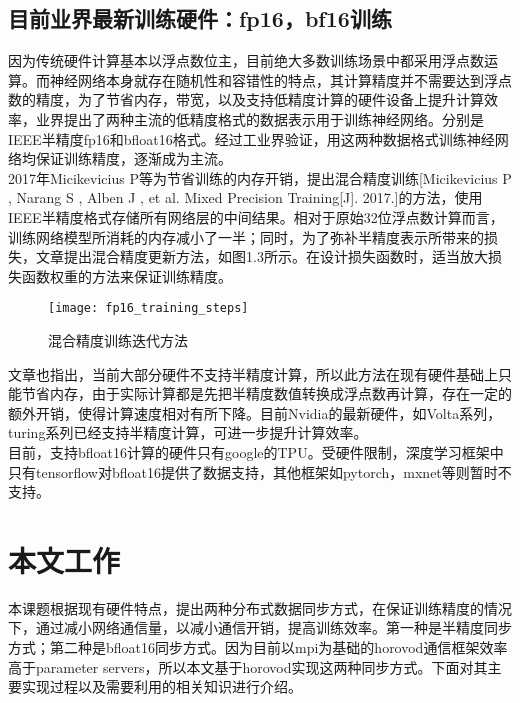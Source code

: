 \subsection{目前业界最新训练硬件：fp16，bf16训练}
因为传统硬件计算基本以浮点数位主，目前绝大多数训练场景中都采用浮点数运算。而神经网络本身就存在随机性和容错性的特点，其计算精度并不需要达到浮点数的精度，为了节省内存，带宽，以及支持低精度计算的硬件设备上提升计算效率，业界提出了两种主流的低精度格式的数据表示用于训练神经网络。分别是IEEE半精度fp16和bfloat16格式。经过工业界验证，用这两种数据格式训练神经网络均保证训练精度，逐渐成为主流。\\
2017年Micikevicius P等为节省训练的内存开销，提出混合精度训练[Micikevicius P , Narang S , Alben J , et al. Mixed Precision Training[J]. 2017.]的方法，使用IEEE半精度格式存储所有网络层的中间结果。相对于原始32位浮点数计算而言，训练网络模型所消耗的内存减小了一半；同时，为了弥补半精度表示所带来的损失，文章提出混合精度更新方法，如图1.3所示。在设计损失函数时，适当放大损失函数权重的方法来保证训练精度。\\
\begin{figure}[htp]
\centering
\texttt{[image: fp16\_training\_steps]}
\caption{混合精度训练迭代方法}
\end{figure}
文章也指出，当前大部分硬件不支持半精度计算，所以此方法在现有硬件基础上只能节省内存，由于实际计算都是先把半精度数值转换成浮点数再计算，存在一定的额外开销，使得计算速度相对有所下降。目前Nvidia的最新硬件，如Volta系列，turing系列已经支持半精度计算，可进一步提升计算效率。\\
目前，支持bfloat16计算的硬件只有google的TPU。受硬件限制，深度学习框架中只有tensorflow对bfloat16提供了数据支持，其他框架如pytorch，mxnet等则暂时不支持。

\section{本文工作}
本课题根据现有硬件特点，提出两种分布式数据同步方式，在保证训练精度的情况下，通过减小网络通信量，以减小通信开销，提高训练效率。第一种是半精度同步方式；第二种是bfloat16同步方式。因为目前以mpi为基础的horovod通信框架效率高于parameter servers，所以本文基于horovod实现这两种同步方式。下面对其主要实现过程以及需要利用的相关知识进行介绍。
